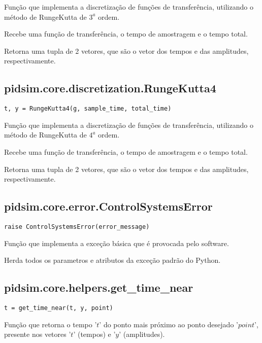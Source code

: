    Função que implementa a discretização de funções de transferência,
    utilizando o método de RungeKutta de $3^a$ ordem.
    
    Recebe uma função de transferência, o tempo de amostragem e o tempo
    total.
    
    Retorna uma tupla de 2 vetores, que são o vetor dos tempos e das amplitudes,
    respectivamente.

\subsection{pidsim.core.discretization.RungeKutta4}

    \begin{verbatim}
t, y = RungeKutta4(g, sample_time, total_time)\end{verbatim}
    
    Função que implementa a discretização de funções de transferência,
    utilizando o método de RungeKutta de $4^a$ ordem.
    
    Recebe uma função de transferência, o tempo de amostragem e o tempo
    total.
    
    Retorna uma tupla de 2 vetores, que são o vetor dos tempos e das amplitudes,
    respectivamente.

\subsection{pidsim.core.error.ControlSystemsError}

    \begin{verbatim}
raise ControlSystemsError(error_message)\end{verbatim}
    
    Função que implementa a exceção básica que é provocada pelo software.
    
    Herda todos os parametros e atributos da exceção padrão do Python.

\subsection{pidsim.core.helpers.get\_time\_near}

    \begin{verbatim}
t = get_time_near(t, y, point)\end{verbatim}
    
    Função que retorna o tempo '$t$' do ponto mais próximo ao ponto
    desejado '$point$', presente nos vetores '$t$' (tempos) e '$y$'
    (amplitudes).
    

